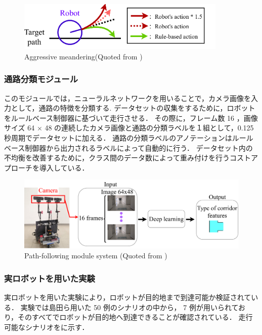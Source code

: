 \begin{figure}[htbp]
  \centering
  \includegraphics[width=100mm]{images/pdf/fujiwara/behavior.pdf}
  \caption[Aggressive meandering]{Aggressive meandering(Quoted from \cite{fujiwara2023})}
  \label{fig:behavior}
\end{figure}

\subsubsection{通路分類モジュール}
このモジュールでは，ニューラルネットワークを用いることで，カメラ画像を入力として，通路の特徴を分類する.
データセットの収集をするために，ロボットをルールベース制御器に基づいて走行させる．
その際に，フレーム数 16 ，画像サイズ 64 × 48 の連続したカメラ画像と通路の分類ラベルを１組として，0.125 秒周期でデータセットに加える．
通路の分類ラベルのアノテーションはルールベース制御器から出力されるラベルによって自動的に行う．
データセット内の不均衡を改善するために，クラス間のデータ数によって重み付けを行うコストアプローチを導入している．

\begin{figure}[htbp]
  \centering
   \includegraphics[width=130mm]{images/pdf/haruyama/intersection_sys.pdf}
   \caption[Path-following module system]{Path-following module system (Quoted from \cite{haruyama2023})}
   \label{fig:intersection}
\end{figure}

\subsubsection{実ロボットを用いた実験}
実ロボットを用いた実験により，ロボットが目的地まで到達可能か検証されている．
実験では島田ら用いた 50 例のシナリオの中から， 7 例が用いられており，そのすべてでロボットが目的地へ到達できることが確認されている．
走行可能なシナリオをに示す．

